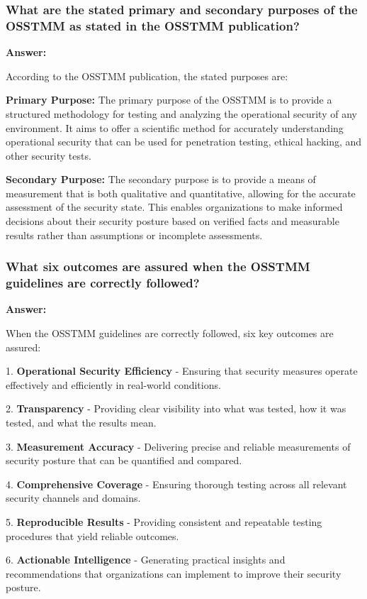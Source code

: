 \documentclass[12pt,a4paper]{article}
\begin{document}
\subsubsection{What are the stated primary and secondary purposes of the OSSTMM as stated in the OSSTMM publication?}

\textbf{Answer:}

According to the OSSTMM publication, the stated purposes are:

\textbf{Primary Purpose:} The primary purpose of the OSSTMM is to provide a structured methodology for testing and analyzing the operational security of any environment. It aims to offer a scientific method for accurately understanding operational security that can be used for penetration testing, ethical hacking, and other security tests.

\textbf{Secondary Purpose:} The secondary purpose is to provide a means of measurement that is both qualitative and quantitative, allowing for the accurate assessment of the security state. This enables organizations to make informed decisions about their security posture based on verified facts and measurable results rather than assumptions or incomplete assessments.

\subsubsection{What six outcomes are assured when the OSSTMM guidelines are correctly followed?}

\textbf{Answer:}

When the OSSTMM guidelines are correctly followed, six key outcomes are assured:

1. \textbf{Operational Security Efficiency} - Ensuring that security measures operate effectively and efficiently in real-world conditions.

2. \textbf{Transparency} - Providing clear visibility into what was tested, how it was tested, and what the results mean.

3. \textbf{Measurement Accuracy} - Delivering precise and reliable measurements of security posture that can be quantified and compared.

4. \textbf{Comprehensive Coverage} - Ensuring thorough testing across all relevant security channels and domains.

5. \textbf{Reproducible Results} - Providing consistent and repeatable testing procedures that yield reliable outcomes.

6. \textbf{Actionable Intelligence} - Generating practical insights and recommendations that organizations can implement to improve their security posture.
\end{document}
